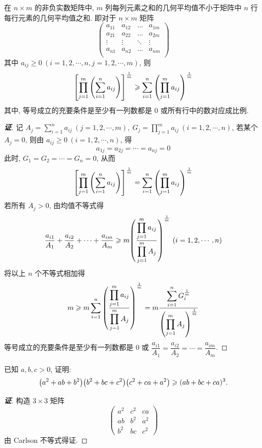 \begin{theorem}
    在 $n\times m$ 的非负实数矩阵中, $m$ 列每列元素之和的几何平均值不小于矩阵中 $n$ 行每行元素的几何平均值之和. 即对于 $n\times m$ 矩阵
    $$\begin{pmatrix}
            a_{11} & a_{12} & \dots  & a_{1m} \\
            a_{21} & a_{22} & \dots  & a_{2m} \\
            \vdots & \vdots & \ddots & \vdots \\
            a_{n1} & a_{n2} & \dots  & a_{nm} \\
        \end{pmatrix}$$
    其中 $a_{ij}\geqslant0~ (i=1,2,\cdots,n,j=1,2,\cdots,m)$, 则
    $$\qty[\prod_{j=1}^{m}\qty(\sum_{i=1}^{n}a_{ij})]^{\frac{1}{m}}\geqslant \sum_{i=1}^{n}\qty(\prod_{j=1}^{m}a_{ij})^{\frac{1}{m}}$$
    其中, 等号成立的充要条件是至少有一列数都是 0 或所有行中的数对应成比例.
\end{theorem}
\begin{proof}[{\songti \textbf{证}}]
    记 $\displaystyle A_j = \sum_{i=1}^{n}a_{ij}~ (j=1,2,\cdots,m),~G_j=\prod_{j=1}^{m}a_{ij}~ (i=1,2,\cdots,n)$, 
    若某个 $A_j=0$, 则由 $a_{ij}\geqslant 0~ (i=1,2,\cdots,n)$, 得 $$a_{1j}=a_{2j}=\cdots=a_{nj}=0$$
    此时, $G_1=G_2=\cdots=G_n=0$, 从而 $$\qty[\prod_{j=1}^{m}\qty(\sum_{i=1}^{n}a_{ij})]^{\frac{1}{m}}=\sum_{i=1}^{n}\qty(\prod_{j=1}^{m}a_{ij})^{\frac{1}{m}}$$
    若所有 $A_j>0$, 由均值不等式得 $$\dfrac{a_{i1}}{A_1}+\dfrac{a_{i2}}{A_2}+\cdots+\dfrac{a_{im}}{A_m}\geqslant m\qty(\dfrac{\displaystyle\prod_{j=1}^{m}a_{ij}}{\displaystyle\prod_{j=1}^{m}A_j})^{\frac{1}{m}}~ (i=1,2,\cdots,n)$$
    将以上 $n$ 个不等式相加得
    $$m\geqslant m\sum_{i=1}^{n}\qty(\dfrac{\displaystyle\prod_{j=1}^{m}a_{ij}}{\displaystyle\prod_{j=1}^{m}A_j})^{\frac{1}{m}}=m\dfrac{\displaystyle\sum_{i=1}^{n}G_i^{\frac{1}{m}}}{\qty(\displaystyle\prod_{j=1}^{m}A_j)^{\frac{1}{m}}}$$
    等号成立的充要条件是至少有一列数都是 0 或 $\dfrac{a_{i1}}{A_1}=\dfrac{a_{i2}}{A_2}=\cdots=\dfrac{a_{im}}{A_m}$.
\end{proof}

\begin{example}
    已知 $a,b,c>0$, 证明: $$\qty(a^2+ab+b^2)\qty(b^2+bc+c^2)\qty(c^2+ca+a^2)\geqslant (ab+bc+ca)^3.$$
\end{example}
\begin{proof}[{\songti \textbf{证}}]
    构造 $3\times 3$ 矩阵
    $$\begin{pmatrix}
            a^2 & c^2 & ca  \\
            ab  & b^2 & a^2 \\
            b^2 & bc  & c^2
        \end{pmatrix}$$
    由 Carlson 不等式得证.
\end{proof}

